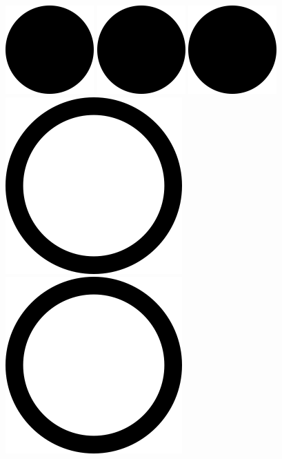 \includegraphics[width=.40cm,height=.40cm]{images/rating/black_circle.png}
\hspace{0}
\includegraphics[width=.40cm,height=.40cm]{images/rating/black_circle.png}
\hspace{0}
\includegraphics[width=.40cm,height=.40cm]{images/rating/black_circle.png}
\hspace{0}
\includegraphics[width=.40cm,height=.40cm]{images/rating/empty_circle.png}
\hspace{0}
\includegraphics[width=.40cm,height=.40cm]{images/rating/empty_circle.png}